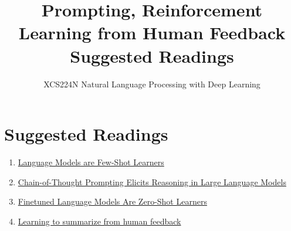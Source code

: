 \documentclass{article}
\title{Prompting, Reinforcement Learning from Human Feedback Suggested Readings}
\author{XCS224N Natural Language Processing with Deep Learning}
\date{}
\begin{document}
\maketitle

\section{Suggested Readings}
\begin{enumerate}
    \item \href{https://arxiv.org/pdf/2005.14165.pdf}{Language Models are Few-Shot Learners}
    \item \href{https://arxiv.org/pdf/2201.11903.pdf}{Chain-of-Thought Prompting Elicits Reasoning in Large Language Models}
    \item \href{https://arxiv.org/pdf/2109.01652.pdf}{Finetuned Language Models Are Zero-Shot Learners}
    \item \href{https://arxiv.org/pdf/2009.01325.pdf}{Learning to summarize from human feedback}
\end{enumerate}
\end{document}
